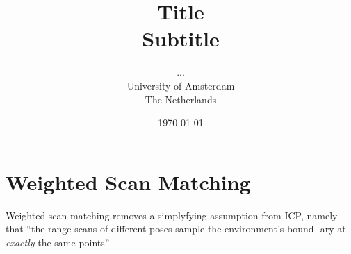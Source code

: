 \documentclass[a4paper]{article}
\title{Title\\
{\large Subtitle}}
\author{...\\
  University of Amsterdam\\
  The Netherlands}
\date{\today}
\begin{document}
\maketitle

\section{Weighted Scan Matching}

Weighted scan matching removes a simplyfying assumption from ICP, namely that ``the range scans of different poses sample the environment's bound-
ary at \emph{exactly} the same points''~\cite{}


{}

\end{document}
